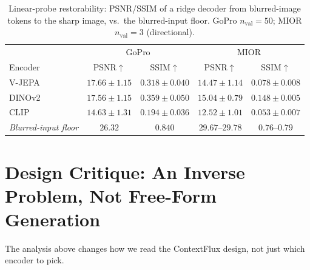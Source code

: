 \documentclass{article}
\begin{document}
\begin{table}[t]
\centering
\caption{Linear-probe restorability: PSNR/SSIM of a ridge decoder from blurred-image tokens to the sharp image, vs.\ the blurred-input floor. GoPro $n_{\mathrm{val}}{=}50$; MIOR $n_{\mathrm{val}}{=}3$ (directional).}
\label{tab:probe}
\footnotesize
\setlength\tabcolsep{3pt}
\begin{tabular}{lcccc}
\toprule
& \multicolumn{2}{c}{GoPro} & \multicolumn{2}{c}{MIOR} \\
Encoder & PSNR$\uparrow$ & SSIM$\uparrow$ & PSNR$\uparrow$ & SSIM$\uparrow$ \\
\midrule
V-JEPA & $17.66 \pm 1.15$ & $0.318 \pm 0.040$ & $14.47 \pm 1.14$ & $0.078 \pm 0.008$ \\
DINOv2 & $17.56 \pm 1.15$ & $0.359 \pm 0.050$ & $15.04 \pm 0.79$ & $0.148 \pm 0.005$ \\
CLIP   & $14.63 \pm 1.31$ & $0.194 \pm 0.036$ & $12.52 \pm 1.01$ & $0.053 \pm 0.007$ \\
\midrule
\textit{Blurred-input floor} & $26.32$ & $0.840$ & $29.67$--$29.78$ & $0.76$--$0.79$ \\
\bottomrule
\end{tabular}
\end{table}

\section{Design Critique: An Inverse Problem, Not Free-Form Generation}
\label{sec:critique}

The analysis above changes how we read the ContextFlux design, not just which encoder to pick.
\end{document}
